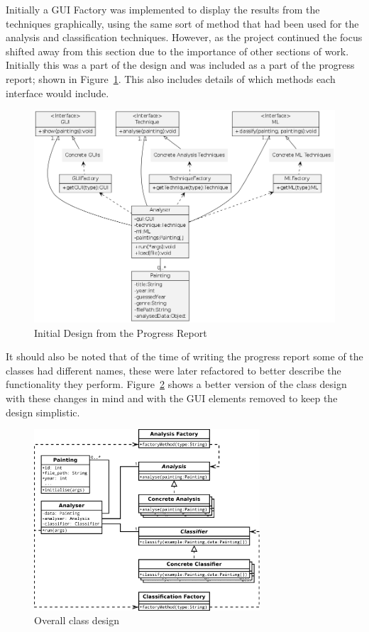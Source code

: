 Initially a GUI Factory was implemented to display the results from the techniques graphically, 
using the same sort of method that had been used for the analysis and classification 
techniques. However, as the project continued the focus shifted away from this section due to
the importance of other sections of work. Initially this was a part of the design and was included 
as a part of the progress report; shown in Figure~\ref{fig:prog-design}. This also 
includes details of which methods each interface would include.


\begin{figure}[h!]
\centering
\includegraphics[width=\textwidth]{../ProgressReport/img/design.png}
\caption{Initial Design from the Progress Report}\label{fig:prog-design}
\end{figure}

It should also be noted that of the time of writing the progress report some of the classes had
different names, these were later refactored to better describe the functionality they perform.
Figure~\ref{fig:uml} shows a better version of the class design with these changes in mind and
with the GUI elements removed to keep the design simplistic.

\begin{figure}[h]
\centering
\includegraphics[width=0.75\textwidth]{img/uml}
\caption{Overall class design}\label{fig:uml}
\end{figure}

